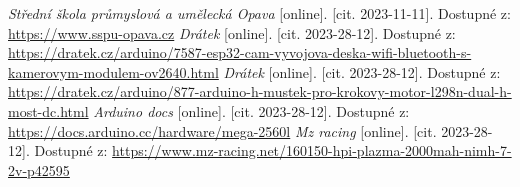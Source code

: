 \documentclass[12pt, a4paper,
oneside,      %
openany
]{report}
\begin{document}
	\begin{thebibliography}{99}
		 \textit{Střední škola průmyslová a umělecká Opava} [online]. [cit. 2023-11-11]. Dostupné z: \url{https://www.sspu-opava.cz}
         \textit{Drátek} [online]. [cit. 2023-28-12].
        Dostupné z: \url{https://dratek.cz/arduino/7587-esp32-cam-vyvojova-deska-wifi-bluetooth-s-kamerovym-modulem-ov2640.html}
         \textit{Drátek} [online]. [cit. 2023-28-12].
        Dostupné z: \url{https://dratek.cz/arduino/877-arduino-h-mustek-pro-krokovy-motor-l298n-dual-h-most-dc.html}
         \textit{Arduino docs} [online]. [cit. 2023-28-12].
        Dostupné z: \url{https://docs.arduino.cc/hardware/mega-2560l}
         \textit{Mz racing} [online]. [cit. 2023-28-12].
        Dostupné z: \url{https://www.mz-racing.net/160150-hpi-plazma-2000mah-nimh-7-2v-p42595}
	\end{thebibliography}	
\end{document}
